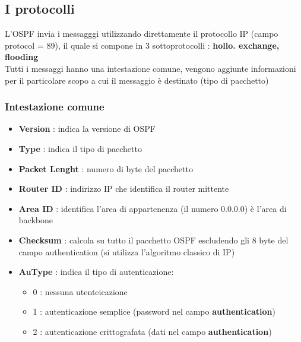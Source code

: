 \documentclass{report}
\begin{document}
            \subsection{I protocolli}
                L'OSPF invia i messagggi utilizzando direttamente il protocollo IP (campo protocol = 89), il quale si compone in 3 sottoprotocolli : \textbf{hollo. exchange, flooding}
                \\
                Tutti i messaggi hanno una intestazione comune, vengono aggiunte informazioni per il particolare scopo a cui il messaggio è destinato (tipo di pacchetto)
                
                \subsubsection{Intestazione comune}
                    \begin{itemize}
                        \item \textbf{Version} : indica la versione di OSPF
                        \item \textbf{Type} : indica il tipo di pacchetto 
                        \item \textbf{Packet Lenght} : numero di byte del pacchetto
                        \item \textbf{Router ID} : indirizzo IP che identifica il router mittente
                        \item \textbf{Area ID} : identifica l'area di appartenenza (il numero 0.0.0.0) è l'area di backbone
                        \item \textbf{Checksum} : calcola su tutto il pacchetto OSPF escludendo gli 8 byte del campo authentication (si utilizza l'algoritmo classico di IP)
                        \item \textbf{AuType} : indica il tipo di autenticazione: 
                            \begin{itemize}
                                \item 0 : nessuna utenteicazione
                                \item 1 : autenticazione semplice (password nel campo \textbf{authentication})
                                \item 2 : autenticazione crittografata (dati nel campo \textbf{authentication})
                            \end{itemize} 
                    \end{itemize}
\end{document}
